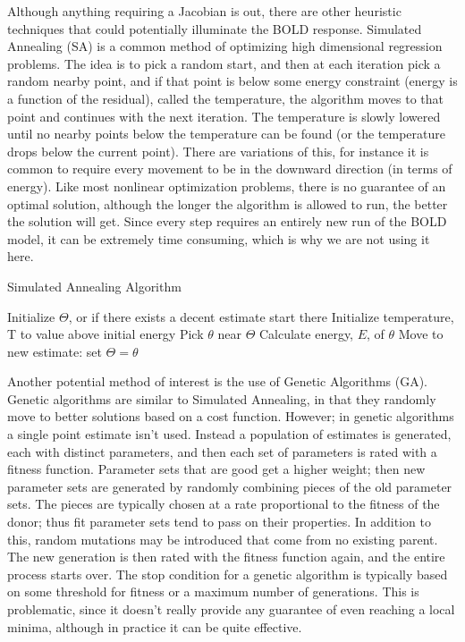Although anything requiring a Jacobian is out, there are other heuristic
techniques that could potentially illuminate the BOLD response. 
Simulated Annealing (SA) is a common method of optimizing high dimensional
regression problems. The idea is to pick a random start, and then
at each iteration pick a random nearby point, and if that point is
below some energy constraint (energy is a function of the residual), 
called the temperature, the algorithm moves
to that point and continues with the next iteration. The temperature
is slowly lowered until no nearby points below the temperature can
be found (or the temperature drops below the current point). There are
variations of this, for instance it is common to require every movement
to be in the downward direction (in terms of energy). Like most nonlinear
optimization problems, there is no guarantee of an optimal solution,
although the longer the algorithm is allowed to run, the better the solution
will get. Since every step requires an entirely new run of the 
BOLD model, it can be extremely time consuming, which is why we are
not using it here.

\begin{algorithm}
\caption{Simulated Annealing Algorithm}
\label{alg:Simulated Annealing}
\begin{algorithmic}
\STATE Initialize $\Theta$, or if there exists a decent estimate start there
\STATE Initialize temperature, T to value above initial energy
    \REPEAT
        \STATE Pick $\theta$ near $\Theta$
        \STATE Calculate energy, $E$, of $\theta$
    \STATE Move to new estimate: set $\Theta = \theta$
\ENDWHILE
\end{algorithmic}
\end{algorithm}


Another potential method of interest is the use of Genetic Algorithms
(GA). Genetic algorithms are similar to Simulated Annealing, in
that they randomly move to better solutions based on a cost function.
However; in genetic algorithms a single point estimate isn't used. Instead
a population of estimates is generated, each with distinct parameters,
and then each set of parameters is rated with a fitness function. Parameter
sets that are good get a higher weight; then new parameter sets are generated by 
randomly combining pieces of the old parameter sets. The pieces are typically
chosen at a rate proportional to the fitness of the donor; thus fit
parameter sets tend to pass on their properties. In addition to this,
random mutations may be introduced that come from no existing parent. 
The new generation is then rated with the fitness function again, and
the entire process starts over. The stop condition for a genetic algorithm
is typically based on some threshold for fitness or a maximum number 
of generations. This is problematic, since it doesn't really provide 
any guarantee of even reaching a local minima, although in practice
it can be quite effective.

